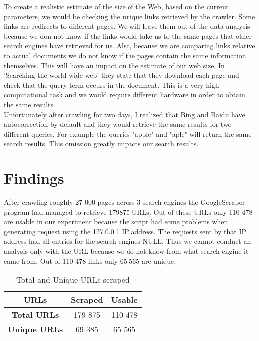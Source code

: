 \documentclass{sig-alternate}
\begin{document}
To create a realistic estimate of the size of the Web, based on the current parameters, we would be checking the unique links retrieved by the crawler. Some links are redirects to different pages. We will leave them out of the data analysis because we don not know if the links would take us to the same pages that other search engines have retrieved for us. Also, because we are comparing links relative to actual documents we do not know if the pages contain the same information themselves. This will have an impact on the estimate of our web size. In 'Searching the world wide web'\cite{LawLee1998} they state that they download each page and check that the query term occurs in the document. This is a very high computational task and we would require different hardware in order to obtain the same results.\\

Unfortunately after crawling for two days, I realized that Bing and Baidu have autocorrection by default and they would retrieve the same results for two different queries. For example the queries "apple" and "aple" will return the same search results. This omission greatly impacts our search results.\\

\section{Findings}

After crawling roughly 27 000 pages across 3 search engines the GoogleScraper program had managed to retrieve 179875 URLs. Out of these URLs only 110 478 are usable in our experiment because the script had some problems when generating request using the 127.0.0.1 IP address. The requests sent by that IP address had all entries for the search engines NULL. Thus we cannot conduct an analysis only with the URL because we do not know from what search engine it came from. Out of 110 478 links only 65 565 are unique.\\

\begin{table}[h]
\centering
\begin{tabular}{|c|c|c|}
\hline
\rowcolor[HTML]{000000} 
{\color[HTML]{FFFFFF} URLs} & {\color[HTML]{FFFFFF} Scraped} & {\color[HTML]{FFFFFF} Usable} \\ \hline
\textbf{Total URLs}         & 179 875                        & 110 478                       \\ \hline
\textbf{Unique URLs}        & 69 385                         & 65 565                        \\ \hline
\end{tabular}
\caption{Total and Unique URLs scraped}
\end{table}
\end{document}
